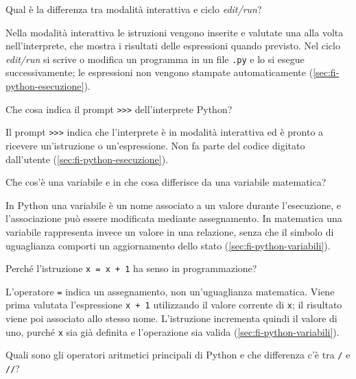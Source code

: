\begin{exercise}
\label{ex:fi-python-interattiva-edit-run}
Qual è la differenza tra modalità interattiva e ciclo
\emph{edit/run}?
\end{exercise}

Nella modalità interattiva le istruzioni vengono inserite e valutate
una alla volta nell'interprete, che mostra i risultati delle espressioni
quando previsto. Nel ciclo \emph{edit/run} si scrive o modifica un
programma in un file \texttt{.py} e lo si esegue successivamente;
le espressioni non vengono stampate automaticamente
(\cref{sec:fi-python-esecuzione}).

\begin{exercise}
\label{ex:fi-python-prompt}
Che cosa indica il prompt \lstinline|>>>| dell'interprete Python?
\end{exercise}

Il prompt \lstinline|>>>| indica che l'interprete è in modalità
interattiva ed è pronto a ricevere un'istruzione o un'espressione.
Non fa parte del codice digitato dall'utente
(\cref{sec:fi-python-esecuzione}).

\begin{exercise}
\label{ex:fi-python-variabile-matematica}
Che cos'è una variabile e in che cosa differisce da una variabile
matematica?
\end{exercise}

In Python una variabile è un nome associato a un valore durante
l'esecuzione, e l'associazione può essere modificata mediante
assegnamento. In matematica una variabile rappresenta invece un valore
in una relazione, senza che il simbolo di uguaglianza comporti un
aggiornamento dello stato (\cref{sec:fi-python-variabili}).

\begin{exercise}
\label{ex:fi-python-assegnamento-incremento}
Perché l'istruzione \texttt{x = x + 1} ha senso in programmazione?
\end{exercise}

L'operatore \texttt{=} indica un assegnamento, non un'uguaglianza
matematica. Viene prima valutata l'espressione \texttt{x + 1}
utilizzando il valore corrente di \texttt{x}; il risultato viene poi
associato allo stesso nome. L'istruzione incrementa quindi il valore
di uno, purché \texttt{x} sia già definita e l'operazione sia valida
(\cref{sec:fi-python-variabili}).

\begin{exercise}
\label{ex:fi-python-operatori-aritmetici}
Quali sono gli operatori aritmetici principali di Python e che
differenza c'è tra \texttt{/} e \lstinline|//|?
\end{exercise}

